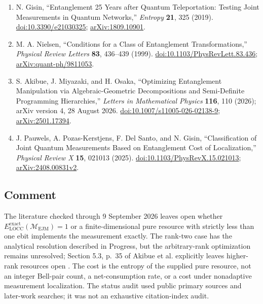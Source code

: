 \begin{enumerate}[label={},leftmargin=4.8em,labelsep=0.5em]
  \footnotesize
  \item[\textup{[Gis19]}]\label{ref:ejm-gisin}
  N. Gisin, ``Entanglement 25 Years after Quantum Teleportation: Testing Joint Measurements in Quantum Networks,'' \emph{Entropy} \textbf{21}, 325 (2019). \href{https://doi.org/10.3390/e21030325}{doi:10.3390/e21030325}; \href{https://arxiv.org/abs/1809.10901}{arXiv:1809.10901}.

  \item[\textup{[Nie99]}]\label{ref:ejm-nielsen}
  M. A. Nielsen, ``Conditions for a Class of Entanglement Transformations,'' \emph{Physical Review Letters} \textbf{83}, 436–439 (1999). \href{https://doi.org/10.1103/PhysRevLett.83.436}{doi:10.1103/PhysRevLett.83.436}; \href{https://arxiv.org/abs/quant-ph/9811053}{arXiv:quant-ph/9811053}.

  \item[\textup{[AMO26]}]\label{ref:ejm-optimization}
  S. Akibue, J. Miyazaki, and H. Osaka, ``Optimizing Entanglement Manipulation via Algebraic-Geometric Decompositions and Semi-Definite Programming Hierarchies,'' \emph{Letters in Mathematical Physics} \textbf{116}, 110 (2026); arXiv version 4, 28 August 2026. \href{https://doi.org/10.1007/s11005-026-02138-9}{doi:10.1007/s11005-026-02138-9}; \href{https://arxiv.org/abs/2501.17394}{arXiv:2501.17394}.

  \item[\textup{[PPDG25]}]\label{ref:ejm-localization}
  J. Pauwels, A. Pozas-Kerstjens, F. Del Santo, and N. Gisin, ``Classification of Joint Quantum Measurements Based on Entanglement Cost of Localization,'' \emph{Physical Review X} \textbf{15}, 021013 (2025). \href{https://doi.org/10.1103/PhysRevX.15.021013}{doi:10.1103/PhysRevX.15.021013}; \href{https://arxiv.org/abs/2408.00831v2}{arXiv:2408.00831v2}.
\end{enumerate}

\subsection*{Comment}

The literature checked through 9 September 2026 leaves open whether $E_{\mathrm{LOCC}}^{\mathrm{exact}}(\mathcal M_{\mathrm{EJM}})=1$ or a finite-dimensional pure resource with strictly less than one ebit implements the measurement exactly. The rank-two case has the analytical resolution described in Progress, but the arbitrary-rank optimization remains unresolved; Section 5.3, p.~35 of Akibue et al. explicitly leaves higher-rank resources open . The cost is the entropy of the supplied pure resource, not an integer Bell-pair count, a net-consumption rate, or a cost under nonadaptive measurement localization. The status audit used public primary sources and later-work searches; it was not an exhaustive citation-index audit.

